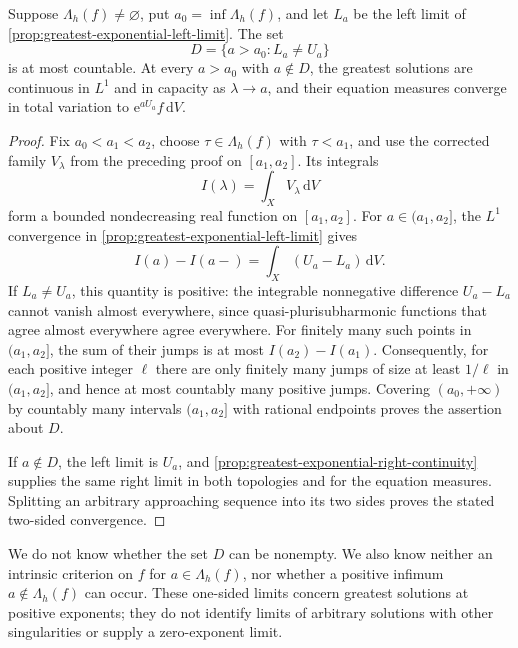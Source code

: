 \begin{proposition}\label{prop:greatest-exponential-countable-jumps}
Suppose $\Lambda_h(f)\ne\varnothing$, put $a_0=\inf\Lambda_h(f)$, and let $L_a$ be the left limit of \cref{prop:greatest-exponential-left-limit}. The set
\[
 D=\{a>a_0:L_a\ne U_a\}
\]
is at most countable. At every $a>a_0$ with $a\notin D$, the greatest solutions are continuous in $L^1$ and in capacity as $\lambda\to a$, and their equation measures converge in total variation to $\mathrm e^{aU_a}f\,\mathrm dV$.
\end{proposition}
\begin{proof}
Fix $a_0<a_1<a_2$, choose $\tau\in\Lambda_h(f)$ with $\tau<a_1$, and use the corrected family $V_\lambda$ from the preceding proof on $[a_1,a_2]$. Its integrals
\[
 I(\lambda)=\int_XV_\lambda\,\mathrm dV
\]
form a bounded nondecreasing real function on $[a_1,a_2]$. For $a\in(a_1,a_2]$, the $L^1$ convergence in \cref{prop:greatest-exponential-left-limit} gives
\[
 I(a)-I(a-)=\int_X(U_a-L_a)\,\mathrm dV.
\]
If $L_a\ne U_a$, this quantity is positive: the integrable nonnegative difference $U_a-L_a$ cannot vanish almost everywhere, since quasi-plurisubharmonic functions that agree almost everywhere agree everywhere. For finitely many such points in $(a_1,a_2]$, the sum of their jumps is at most $I(a_2)-I(a_1)$. Consequently, for each positive integer $\ell$ there are only finitely many jumps of size at least $1/\ell$ in $(a_1,a_2]$, and hence at most countably many positive jumps. Covering $(a_0,+\infty)$ by countably many intervals $(a_1,a_2]$ with rational endpoints proves the assertion about $D$.

If $a\notin D$, the left limit is $U_a$, and \cref{prop:greatest-exponential-right-continuity} supplies the same right limit in both topologies and for the equation measures. Splitting an arbitrary approaching sequence into its two sides proves the stated two-sided convergence.
\end{proof}

We do not know whether the set $D$ can be nonempty. We also know neither an intrinsic criterion on $f$ for $a\in\Lambda_h(f)$, nor whether a positive infimum $a\notin\Lambda_h(f)$ can occur. These one-sided limits concern greatest solutions at positive exponents; they do not identify limits of arbitrary solutions with other singularities or supply a zero-exponent limit.
